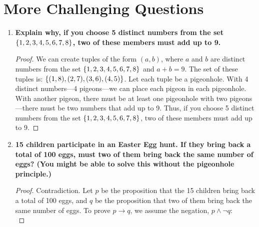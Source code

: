 \documentclass[article, 12pt]{article}
\theoremstyle{definition}
\DeclarePairedDelimiter\set{\{}{\}}
\begin{document}
\section{More Challenging Questions}
\begin{enumerate}[(1)]
    \item \textbf{Explain why, if you choose 5 distinct numbers from the set $\set*{1,2,3,4,5,6,7,8}$, two of these members must add up to 9.}
    \begin{proof}
        We can create tuples of the form $(a,b)$, where $a$ and $b$ are distinct numbers from the set $\set*{1,2,3,4,5,6,7,8}$ and $a+b=9$. The set of these tuples is: $\set*{(1,8),(2,7),(3,6),(4,5)}$. Let each tuple be a pigeonhole. With 4 distinct numbers---4 pigeons---we can place each pigeon in each pigeonhole. With another pigeon, there must be at least one pigeonhole with two pigeons---there must be two numbers that add up to 9. Thus, if you choose 5 distinct numbers from the set $\set*{1,2,3,4,5,6,7,8}$, two of these members must add up to 9.
    \end{proof}
    \item \textbf{15 children participate in an Easter Egg hunt. If they bring back a total of 100 eggs, must two of them bring back the same number of eggs? (You might be able to solve this without the pigeonhole principle.)}
    \begin{proof} Contradiction. Let $p$ be the proposition that the 15 children bring back a total of 100 eggs, and $q$ be the proposition that two of them bring back the same number of eggs. To prove $p \to q$, we assume the negation, $p \land \neg q$: \\


\end{proof}
\end{enumerate}
\end{document}
